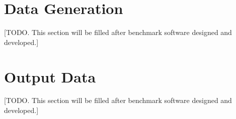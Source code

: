 \section{Data Generation}
[TODO. This section will be filled after benchmark software designed and developed.]

\section{Output Data}
[TODO. This section will be filled after benchmark software designed and developed.]\